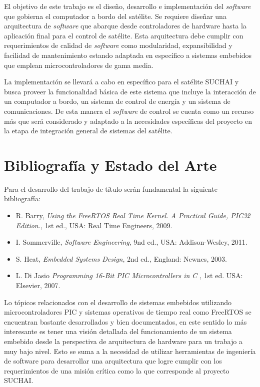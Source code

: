 \documentclass[11pt,letterpaper]{article}
\begin{document}
El objetivo de este trabajo es el diseño, desarrollo e implementación del \textit{software} que gobierna el computador a bordo del satélite. Se requiere diseñar una arquitectura de \textit{software} que abarque desde controladores de hardware hasta la aplicación final para el control de satélite. Esta arquitectura debe cumplir con requerimientos de calidad de \textit{software} como modularidad, expansibilidad y facilidad de mantenimiento estando adaptada en específico a sistemas embebidos que emplean microcontroladores de gama media.

La implementación se llevará a cabo en específico para el satélite SUCHAI y busca proveer la funcionalidad básica de este sistema que incluye la interacción de un computador a bordo, un sistema de control de energía y un sistema de comunicaciones. De esta manera el \textit{software} de control se cuenta como un recurso más que será considerado y adaptado a la necesidades específicas del proyecto en la etapa de integración general de sistemas del satélite.

\section{Bibliografía y Estado del Arte}

Para el desarrollo del trabajo de título serán fundamental la siguiente bibliografía:
\begin{itemize}
	\item R. Barry, \textit{Using the FreeRTOS Real Time Kernel. A Practical Guide, PIC32 Edition.}, 1st ed., USA: Real Time Engineers, 2009.
	\item I. Sommerville, \textit{Software Engineering}, 9nd ed., USA: Addison-Wesley, 2011.
	\item S. Heat, \textit{Embedded Systems Design}, 2nd ed., England: Newnes, 2003.
	\item L. Di Jasio \textit{Programming 16-Bit PIC Microcontrollers in C} , 1st ed. USA: Elsevier, 2007.
\end{itemize}

Lo tópicos relacionados con el desarrollo de sistemas embebidos utilizando microcontroladores PIC y sistemas operativos de tiempo real como FreeRTOS se encuentran bastante desarrollados y bien documentados, en este sentido lo más interesante es tener una visión detallada del funcionamiento de un sistema embebido desde la perspectiva de arquitectura de hardware para un trabajo a muy bajo nivel. Esto se suma a la necesidad de utilizar herramientas de ingeniería de software para desarrollar una arquitectura que logre cumplir con los requerimientos de una misión crítica como la que corresponde al proyecto SUCHAI.\\
\end{document}
